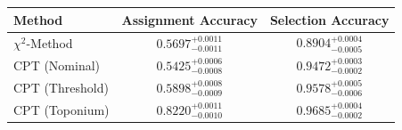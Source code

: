     \begin{tabular}{lcc}
        \toprule
        Method & Assignment Accuracy & Selection Accuracy \\
        \midrule
        $\chi^2$-Method & $0.5697^{+0.0011}_{-0.0011}$ & $0.8904^{+0.0004}_{-0.0005}$ \\
        CPT (Nominal) & $0.5425^{+0.0006}_{-0.0008}$ & $0.9472^{+0.0003}_{-0.0002}$ \\
        CPT (Threshold) & $0.5898^{+0.0008}_{-0.0009}$ & $0.9578^{+0.0005}_{-0.0006}$ \\
        CPT (Toponium) & $0.8220^{+0.0011}_{-0.0010}$ & $0.9685^{+0.0004}_{-0.0002}$ \\
        \bottomrule
    \end{tabular}